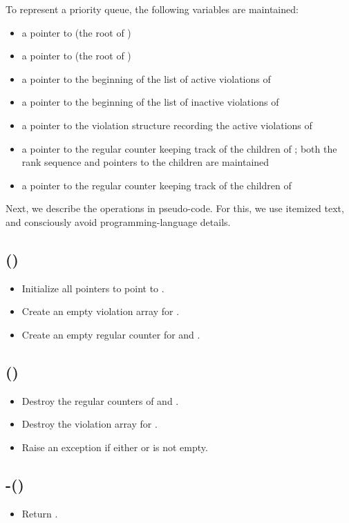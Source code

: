 \documentclass{llncs}
\newcommand{\Construct}{\mbox{}}
\newcommand{\Destroy}{\mbox{}}
\newcommand{\Findmin}{\mbox{\mbox{\rm -}}}
\begin{document}
To represent a priority queue, the following variables are maintained:
\begin{itemize}
\item a pointer to  (the root of )
\item a pointer to  (the root of )
\item a pointer to the beginning of the list of active violations of
  
\item a pointer to the beginning of the list of inactive violations of
  
\item a pointer to the violation structure recording the active violations of 
\item a pointer to the regular counter keeping track of the children
  of ; both the rank sequence  and pointers to the children are
  maintained
\item a pointer to the regular counter keeping track of the children of 
\end{itemize}

\noindent
Next, we describe the operations in pseudo-code. For this, we use
itemized text, and consciously avoid programming-language details.

\subsection*{\Construct{}()}

\begin{itemize}
\item Initialize all pointers to point to .
\item Create an empty violation array for .
\item Create an empty regular counter for  and .
\end{itemize}

\subsection*{\Destroy{}()}

\begin{itemize}
\item Destroy the regular counters of  and .
\item Destroy the violation array for .
\item Raise an exception if either  or  is not empty.
\end{itemize}

\subsection*{\Findmin{}()}
\begin{itemize}
\item Return .
\end{itemize}
\end{document}
